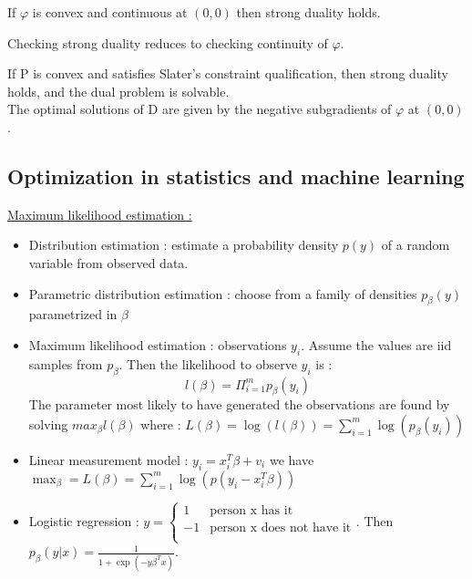 \documentclass[../main.tex]{subfiles}
\begin{document}
\begin{theorem}
    If $\varphi$ is convex and continuous at $(0,0)$ then strong duality holds.
\end{theorem}

\begin{center}
    Checking strong duality reduces to checking continuity of $\varphi$.
\end{center}

\begin{theorem}
    If P is convex and satisfies Slater's constraint qualification, then strong duality holds, and the dual problem is solvable.\\

    The optimal solutions of D are given by the negative subgradients of $\varphi$ at $(0,0)$.
\end{theorem}

\subsection{Optimization in statistics and machine learning}

\quad \underline{Maximum likelihood estimation :}\\
\begin{itemize}
    \item Distribution estimation : estimate a probability density $p(y)$ of a random variable from observed data.
    \item Parametric distribution estimation : choose from a family of densities $p_\beta(y)$ parametrized in $\beta$
    \item Maximum likelihood estimation : observations $y_i$. Assume the values are iid samples from $p_\beta$. Then the likelihood to observe $y_i$ is : \begin{equation}
        l(\beta) = \Pi_{i=1}^m p_\beta (y_i)
    \end{equation}
    The parameter most likely to have generated the observations are found by solving $max_\beta l(\beta)$ where : $L(\beta) = \log(l(\beta)) = \sum_{i=1}^m \log(p_\beta(y_i))$
\end{itemize}

\begin{itemize}
    \item Linear measurement model : $y_i = x_i^T \beta + v_i$ we have $\max_\beta = L(\beta) = \sum_{i=1}^m \log(p(y_i - x_i^T \beta))$
    \item Logistic regression : $y = \begin{cases}
        1 & \text{person x has it}\\
        -1 & \text{person x does not have it}\\
    \end{cases}$. Then $p_\beta(y|x) = \frac{1}{1+ \exp(-y \beta^T x)}$.
\end{itemize}
\end{document}
